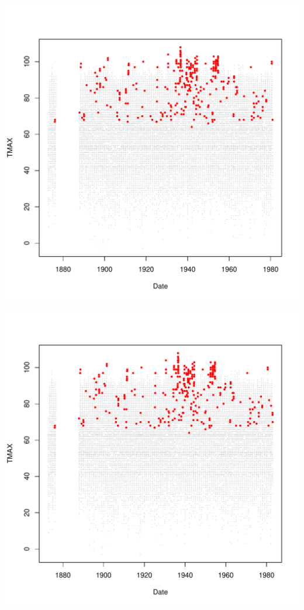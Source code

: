 \documentclass{article}\usepackage[]{graphicx}\usepackage[]{color}
\makeatletter
\def\maxwidth{ %
  \ifdim\Gin@nat@width>\linewidth
    \linewidth
  \else
    \Gin@nat@width
  \fi
}
\newenvironment{knitrout}{}{} %
\makeatother
\begin{document}
\begin{knitrout}
\includegraphics[width=\maxwidth]{figure/unnamed-chunk-4-50} 

\includegraphics[width=\maxwidth]{figure/unnamed-chunk-4-51} 


\end{knitrout}
\end{document}
